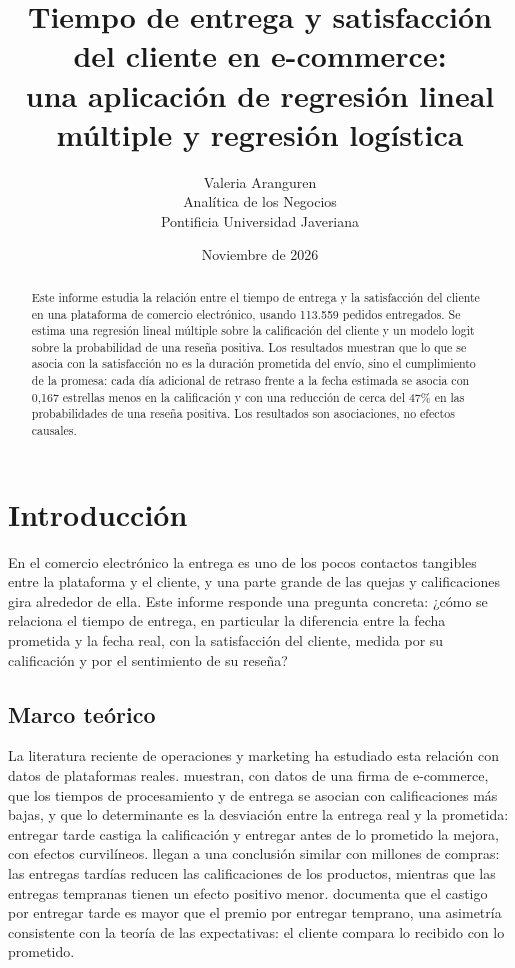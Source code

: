 \documentclass[11pt]{article}
\title{\textbf{Tiempo de entrega y satisfacción del cliente en e-commerce:\\
una aplicación de regresión lineal múltiple y regresión logística}}
\author{Valeria Aranguren\\
Analítica de los Negocios\\
Pontificia Universidad Javeriana}
\date{Noviembre de 2026}
\begin{document}
\maketitle

\begin{abstract}
\noindent Este informe estudia la relación entre el tiempo de entrega y la
satisfacción del cliente en una plataforma de comercio electrónico, usando
113.559 pedidos entregados. Se estima una regresión lineal múltiple sobre la
calificación del cliente y un modelo logit sobre la probabilidad de una reseña
positiva. Los resultados muestran que lo que se asocia con la satisfacción no
es la duración prometida del envío, sino el cumplimiento de la promesa: cada
día adicional de retraso frente a la fecha estimada se asocia con 0,167
estrellas menos en la calificación y con una reducción de cerca del 47\% en
las probabilidades de una reseña positiva. Los resultados son asociaciones, no
efectos causales.
\end{abstract}

\section{Introducción}

En el comercio electrónico la entrega es uno de los pocos contactos tangibles
entre la plataforma y el cliente, y una parte grande de las quejas y
calificaciones gira alrededor de ella. Este informe responde una pregunta
concreta: ¿cómo se relaciona el tiempo de entrega, en particular la
diferencia entre la fecha prometida y la fecha real, con la satisfacción del
cliente, medida por su calificación y por el sentimiento de su reseña?

\subsection{Marco teórico}

La literatura reciente de operaciones y marketing ha estudiado esta relación
con datos de plataformas reales. \textcite{akturk2022} muestran, con datos de
una firma de e-commerce, que los tiempos de procesamiento y de entrega se
asocian con calificaciones más bajas, y que lo determinante es la desviación
entre la entrega real y la prometida: entregar tarde castiga la calificación y
entregar antes de lo prometido la mejora, con efectos curvilíneos.
\textcite{nozari2026} llegan a una conclusión similar con millones de compras:
las entregas tardías reducen las calificaciones de los productos, mientras que
las entregas tempranas tienen un efecto positivo menor. \textcite{ravula2023}
documenta que el castigo por entregar tarde es mayor que el premio por
entregar temprano, una asimetría consistente con la teoría de las
expectativas: el cliente compara lo recibido con lo prometido.
\end{document}
